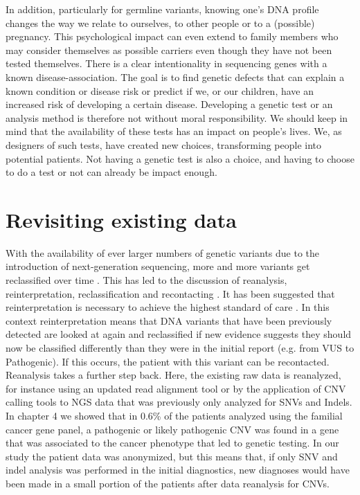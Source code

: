 In addition, particularly for germline variants, knowing one’s DNA profile changes the way we relate to ourselves, to other people or to a (possible) pregnancy.
This psychological impact can even extend to family members who may consider themselves as possible carriers even though they have not been tested themselves. 
There is a clear intentionality in sequencing genes with a known disease-association. 
The goal is to find genetic defects that can explain a known condition or disease risk or predict if we, or our children, have an increased risk of developing a certain disease. 
Developing a genetic test or an analysis method is therefore not without moral responsibility. We should keep in mind that the availability of these tests has an impact on people’s lives. 
We, as designers of such tests, have created new choices, transforming people into potential patients. 
Not having a genetic test is also a choice, and having to choose to do a test or not can already be impact enough. 

\section{Revisiting existing data} 
With the availability of ever larger numbers of genetic variants due to the introduction of next-generation sequencing, more and more variants get reclassified over time \cite{Shah_2018}. 
This has led to the discussion of reanalysis, reinterpretation, reclassification and recontacting \cite{Carrieri_2018}. 
It has been suggested that reinterpretation is necessary to achieve the highest standard of care \cite{Chisholm_2017}. 
In this context reinterpretation means that DNA variants that have been previously detected are looked at again and reclassified if new evidence suggests they should now be classified differently than they were in the initial report (e.g. from VUS to Pathogenic). 
If this occurs, the patient with this variant can be recontacted. 
Reanalysis takes a further step back. Here, the existing raw data is reanalyzed, for instance using an updated read alignment tool or by the application of CNV calling tools to NGS data that was previously only analyzed for SNVs and Indels. 
In chapter 4 we showed that in 0.6\% of the patients analyzed using the familial cancer gene panel, a pathogenic or likely pathogenic CNV was found in a gene that was associated to the cancer phenotype that led to genetic testing. 
In our study the patient data was anonymized, but this means that, if only SNV and indel analysis was performed in the initial diagnostics, new diagnoses would have been made in a small portion of the patients after data reanalysis for CNVs. 

